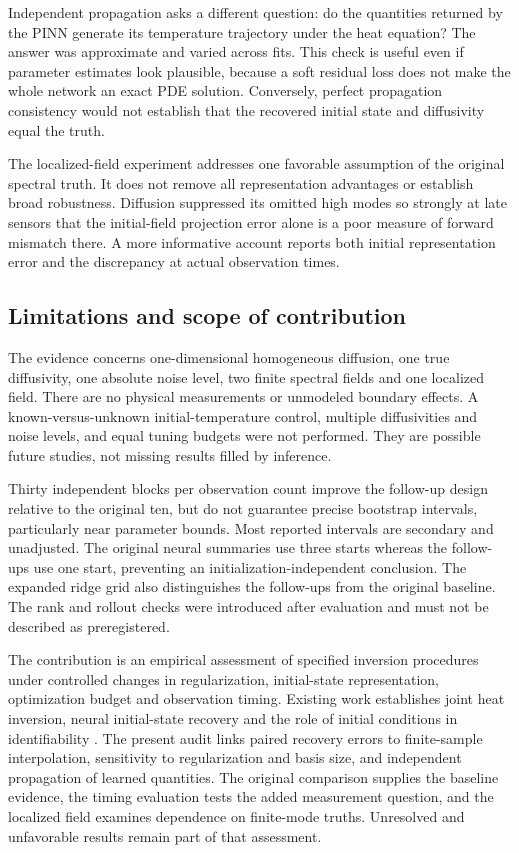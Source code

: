 \documentclass[11pt,a4paper]{article}
\begin{document}
Independent propagation asks a different question: do the quantities returned by the PINN generate its temperature trajectory under the heat equation? The answer was approximate and varied across fits. This check is useful even if parameter estimates look plausible, because a soft residual loss does not make the whole network an exact PDE solution. Conversely, perfect propagation consistency would not establish that the recovered initial state and diffusivity equal the truth.

The localized-field experiment addresses one favorable assumption of the original spectral truth. It does not remove all representation advantages or establish broad robustness. Diffusion suppressed its omitted high modes so strongly at late sensors that the initial-field projection error alone is a poor measure of forward mismatch there. A more informative account reports both initial representation error and the discrepancy at actual observation times.

\subsection{Limitations and scope of contribution}
The evidence concerns one-dimensional homogeneous diffusion, one true diffusivity, one absolute noise level, two finite spectral fields and one localized field. There are no physical measurements or unmodeled boundary effects. A known-versus-unknown initial-temperature control, multiple diffusivities and noise levels, and equal tuning budgets were not performed. They are possible future studies, not missing results filled by inference.

Thirty independent blocks per observation count improve the follow-up design relative to the original ten, but do not guarantee precise bootstrap intervals, particularly near parameter bounds. Most reported intervals are secondary and unadjusted. The original neural summaries use three starts whereas the follow-ups use one start, preventing an initialization-independent conclusion. The expanded ridge grid also distinguishes the follow-ups from the original baseline. The rank and rollout checks were introduced after evaluation and must not be described as preregistered.

The contribution is an empirical assessment of specified inversion procedures under controlled changes in regularization, initial-state representation, optimization budget and observation timing. Existing work establishes joint heat inversion, neural initial-state recovery and the role of initial conditions in identifiability \citep{ref002,ref003,ref076,bilo2026}. The present audit links paired recovery errors to finite-sample interpolation, sensitivity to regularization and basis size, and independent propagation of learned quantities. The original comparison supplies the baseline evidence, the timing evaluation tests the added measurement question, and the localized field examines dependence on finite-mode truths. Unresolved and unfavorable results remain part of that assessment.
\end{document}
